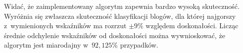 \documentclass[a4paper,11pt]{article}
\begin{document}
Widać, że zaimplementowany algorytm zapewnia bardzo wysoką skuteczność. Wyróżnia się zwłaszcza skuteczność klasyfikacji blogów, dla której najgorszy z~wymienionych wskaźników ma rozrzut $\pm 9\%$ względem doskonałości. Licząc średnie odchylenie wskaźników od doskonałości można wywnioskować, że  algorytm jest miarodajny w~$92,125\%$ przypadków.
\end{document}
